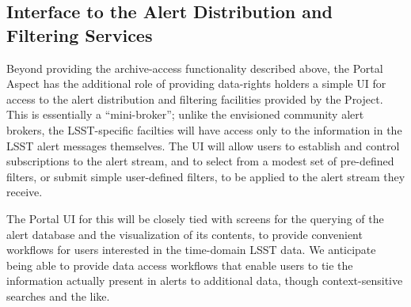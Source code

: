 \subsection{Interface to the Alert Distribution and Filtering Services}

Beyond providing the archive-access functionality described above, the Portal Aspect has the additional role of providing data-rights holders a simple UI for access to the alert distribution and filtering facilities provided by the Project.
This is essentially a ``mini-broker''; unlike the envisioned community alert brokers, the LSST-specific facilties will have access only to the information in the LSST alert messages themselves.
The UI will allow users to establish and control subscriptions to the alert stream, and to select from a modest set of pre-defined filters, or submit simple user-defined filters, to be applied to the alert stream they receive.

The Portal UI for this will be closely tied with screens for the querying of the alert database and the visualization of its contents, to provide convenient workflows for users interested in the time-domain LSST data.
We anticipate being able to provide data access workflows that enable users to tie the information actually present in alerts to additional data, though context-sensitive searches and the like.
